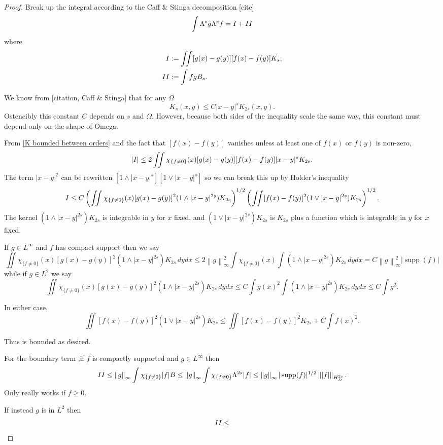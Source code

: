 \documentclass[11pt]{amsart}
\theoremstyle{remark}
\theoremstyle{definition}
\newcommand{\norm}[1]{\left\lVert#1\right\rVert}
\newcommand{\paren}[1]{\left( #1 \right)}
\newcommand{\abs}[1]{\left\lvert #1 \right\rvert}
\DeclareMathOperator{\supp}{supp}
\newcommand{\indic}[1]{\chi_{\{#1\}}}
\newcommand{\Rom}[1]{\MakeUppercase{\romannumeral #1}}
\begin{document}
\begin{proof}
Break up the integral according to the Caff \& Stinga decomposition [cite]
\[ \int \Lambda^s g \Lambda^s f = \Rom{1} + \Rom{2} \]
where
\begin{align*} 
\Rom{1} &:= \iint [g(x)-g(y)][f(x)-f(y)] K_s, \\
\Rom{2} &:= \int f g B_s. 
\end{align*}

We know from [citation, Caff \& Stinga] that for any $\Omega$
\begin{equation} \label{K bounded between orders} K_s(x,y) \leq C |x-y|^s K_{2s}(x,y). \end{equation}
Ostencibly this constant $C$ depends on $s$ and $\Omega$.  However, because both sides of the inequality scale the same way, this constant must depend only on the shape of Omega.  

From \eqref{K bounded between orders} and the fact that $[f(x)-f(y)]$ vanishes unless at least one of $f(x)$ or $f(y)$ is non-zero,
\[ \abs{\Rom{1}} \leq 2 \iint \indic{f \neq 0}(x) [g(x)-g(y)] [f(x)-f(y)] |x-y|^s K_{2s}. \]
The term $|x-y|^2$ can be rewritten $[1 \wedge |x-y|^s] [1 \vee |x-y|^s]$ so we can break this up by Holder's inequality
\[ \Rom{1} \leq C \paren{\iint \indic{f \neq 0}(x) [g(x)-g(y)]^2 (1 \wedge |x-y|^{2s}) K_{2s} }^{1/2} \paren{\iint [f(x)-f(y)]^2 (1 \vee |x-y|^{2s}) K_{2s} }^{1/2}. \]
The kernel $(1 \wedge |x-y|^{2s}) K_{2s}$ is integrable in $y$ for $x$ fixed, and $(1 \vee |x-y|^{2s}) K_{2s}$ is $K_{2s}$ plus a function which is integrable in $y$ for $x$ fixed.  

If $g \in L^\infty$ and $f$ has compact support then we say
\[ \iint \indic{f \neq 0}(x) [g(x)-g(y)]^2 (1 \wedge |x-y|^{2s}) K_{2s} \,dydx \leq 2 \norm{g}_\infty^2 \int \indic{f \neq 0}(x) \int (1 \wedge |x-y|^{2s}) K_{2s} \,dydx = C \norm{g}_\infty^2 |\supp(f)| \]
while if $g \in L^2$ we say
\[ \iint \indic{f \neq 0}(x) [g(x)-g(y)]^2 (1 \wedge |x-y|^{2s}) K_{2s} \,dydx \leq C \int g(x)^2 \int (1 \wedge |x-y|^{2s}) K_{2s} \,dydx \leq C \int g^2. \]

In either case, 
\[ \iint [f(x)-f(y)]^2 (1 \vee |x-y|^{2s}) K_{2s} \leq \iint [f(x)-f(y)]^2 K_{2s} + C \int f(x)^2. \]

Thus \Rom{1} is bounded as desired.  

For the boundary term \Rom{2},if $f$ is compactly supported and $g \in L^\infty$ then
\[ \Rom{2} \leq \norm{g}_\infty \int\indic{f\neq 0} |f| B \leq \norm{g}_\infty \int \indic{f\neq 0} \Lambda^{2s} |f| \leq \norm{g}_\infty |\supp(f)|^{1/2} \norm{|f|}_{H_D^{2s}}. \]
Only really works if $f \geq 0$.  

If instead $g$ is in $L^2$ then
\[ \Rom{2} \leq \]
\end{proof}
\end{document}

